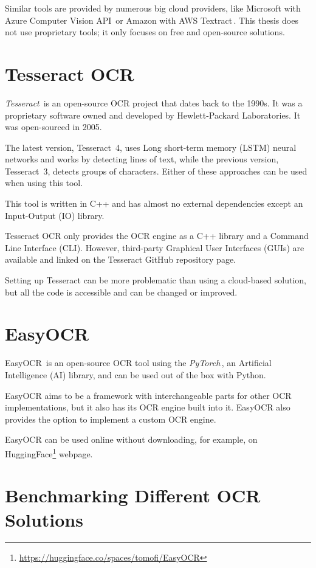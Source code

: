 \documentclass[
  digital,     %
  oneside,     %
  nosansbold,  %
  nocolorbold, %
  nolof,         %
  nolot,         %
]{fithesis4}
\begin{document}
Similar tools are provided by numerous big cloud providers, like Microsoft with Azure Computer Vision API\,\cite{azurevision} or Amazon with AWS Textract\,\cite{awstextract}. This thesis does not use proprietary tools; it only focuses on free and open-source solutions.

\section{Tesseract OCR}

\emph{Tesseract}\,\cite{tesseract} is an open-source OCR project that dates back to the 1990s. It was a proprietary software owned and developed by Hewlett-Packard Laboratories. It was open-sourced in 2005.

The latest version, Tesseract~4, uses Long short-term memory (LSTM) neural networks and works by detecting lines of text, while the previous version, Tesseract~3, detects groups of characters. Either of these approaches can be used when using this tool.

This tool is written in C++ and has almost no external dependencies except an Input-Output (IO) library.

Tesseract OCR only provides the OCR engine as a C++ library and a Command Line Interface (CLI). However, third-party Graphical User Interfaces (GUIs) are available and linked on the Tesseract GitHub repository page.

Setting up Tesseract can be more problematic than using a cloud-based solution, but all the code is accessible and can be changed or improved.

\section{EasyOCR}

EasyOCR\,\cite{easyocr} is an open-source OCR tool using the \emph{PyTorch}\,\cite{pytorch}, an Artificial Intelligence (AI) library, and can be used out of the box with Python.

EasyOCR aims to be a framework with interchangeable parts for other OCR implementations, but it also has its OCR engine built into it. EasyOCR also provides the option to implement a custom OCR engine.

EasyOCR can be used online without downloading, for example, on HuggingFace\footnote{\href{https://huggingface.co/spaces/tomofi/EasyOCR}{https://huggingface.co/spaces/tomofi/EasyOCR}} webpage.

\section{Benchmarking Different OCR Solutions}
\end{document}
